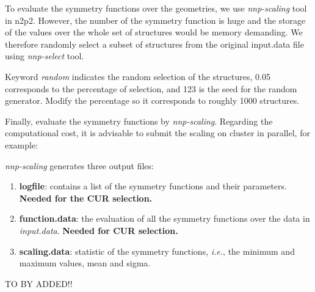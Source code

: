 \documentclass[12pt]{article}
\begin{document}
To evaluate the symmetry functions over the geometries, we use \textit{nnp-scaling} tool in n2p2. However, the number of the symmetry function is huge and the storage of the values over the whole set of structures would be memory demanding. We therefore randomly select a subset of structures from the original input.data file using \textit{nnp-select} tool.

\begin{center}
\end{center}

Keyword \textit{random} indicates the random selection of the structures, 0.05 corresponds to the percentage of selection, and 123 is the seed for the random generator. Modify the percentage so it corresponds to roughly 1000 structures.

Finally, evaluate the symmetry functions by \textit{nnp-scaling}. Regarding the computational cost, it is advisable to submit the scaling on cluster in parallel, for example:

\begin{center}
\end{center}


\textit{nnp-scaling} generates three output files:
\begin{enumerate}
    \item \textbf{logfile}: contains a list of the symmetry functions and their parameters. \textbf{Needed for the CUR selection.}
    \item \textbf{function.data}: the evaluation of all the symmetry functions over the data in \textit{input.data}. \textbf{Needed for CUR selection.}
    \item \textbf{scaling.data}: statistic of the symmetry functions, \textit{i.e.}, the minimum and maximum values, mean and sigma.
\end{enumerate}

TO BY ADDED!!
\end{document}
